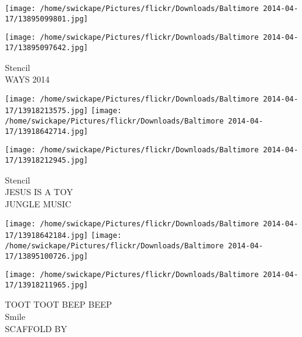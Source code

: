 \documentclass[10pt,letterpaper]{article}
\begin{document}
\texttt{[image: /home/swickape/Pictures/flickr/Downloads/Baltimore 2014-04-17/13895099801.jpg]}

\vspace{0.25in}
\texttt{[image: /home/swickape/Pictures/flickr/Downloads/Baltimore 2014-04-17/13895097642.jpg]}

Stencil\\
WAYS 2014\\
\pagebreak

\texttt{[image: /home/swickape/Pictures/flickr/Downloads/Baltimore 2014-04-17/13918213575.jpg]}
\texttt{[image: /home/swickape/Pictures/flickr/Downloads/Baltimore 2014-04-17/13918642714.jpg]}

\vspace{0.25in}
\texttt{[image: /home/swickape/Pictures/flickr/Downloads/Baltimore 2014-04-17/13918212945.jpg]}

Stencil\\
JESUS IS A TOY\\
JUNGLE MUSIC\\
\pagebreak

\texttt{[image: /home/swickape/Pictures/flickr/Downloads/Baltimore 2014-04-17/13918642184.jpg]}
\texttt{[image: /home/swickape/Pictures/flickr/Downloads/Baltimore 2014-04-17/13895100726.jpg]}

\texttt{[image: /home/swickape/Pictures/flickr/Downloads/Baltimore 2014-04-17/13918211965.jpg]}

TOOT TOOT BEEP BEEP\\
Smile\\
SCAFFOLD BY\\
\pagebreak
\end{document}
